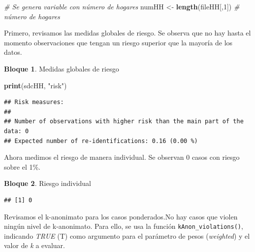 \documentclass[]{book}
\newenvironment{Shaded}{\begin{snugshade}}{\end{snugshade}}
\newcommand{\CommentTok}[1]{\textcolor[rgb]{0.56,0.35,0.01}{\textit{#1}}}
\newcommand{\DecValTok}[1]{\textcolor[rgb]{0.00,0.00,0.81}{#1}}
\newcommand{\FloatTok}[1]{\textcolor[rgb]{0.00,0.00,0.81}{#1}}
\newcommand{\KeywordTok}[1]{\textcolor[rgb]{0.13,0.29,0.53}{\textbf{#1}}}
\newcommand{\NormalTok}[1]{#1}
\newcommand{\OperatorTok}[1]{\textcolor[rgb]{0.81,0.36,0.00}{\textbf{#1}}}
\newcommand{\StringTok}[1]{\textcolor[rgb]{0.31,0.60,0.02}{#1}}
\theoremstyle{definition}
\theoremstyle{definition}
\newtheorem{example}{Bloque}[chapter]
\theoremstyle{definition}
\theoremstyle{definition}
\theoremstyle{remark}
\begin{document}
\begin{Shaded}
\begin{Highlighting}[]
\CommentTok{# Se genera variable con número de hogares}
\NormalTok{numHH <-}\StringTok{ }\KeywordTok{length}\NormalTok{(fileHH[,}\DecValTok{1}\NormalTok{]) }\CommentTok{# número de hogares }
\end{Highlighting}
\end{Shaded}

Primero, revisamos las medidas globales de riesgo. Se observa que no hay hasta el momento observaciones que tengan un riesgo superior que la mayoría de los datos.

\begin{example}
\protect\hypertarget{exm:bloque45nbm}{}{\label{exm:bloque45nbm} }Medidas globales de riesgo
\end{example}

\begin{Shaded}
\begin{Highlighting}[]
\KeywordTok{print}\NormalTok{(sdcHH, }\StringTok{"risk"}\NormalTok{)}
\end{Highlighting}
\end{Shaded}

\begin{verbatim}
## Risk measures:
## 
## Number of observations with higher risk than the main part of the data: 0
## Expected number of re-identifications: 0.16 (0.00 %)
\end{verbatim}

Ahora medimos el riesgo de manera individual. Se observan 0 casos con riesgo sobre el 1\%.
\begin{example}
\protect\hypertarget{exm:bloque46nbm}{}{\label{exm:bloque46nbm} }Riesgo individual
\end{example}

\begin{Shaded}
\end{Shaded}

\begin{verbatim}
## [1] 0
\end{verbatim}

Revisamos el k-anonimato para los casos ponderados.No hay casos que violen ningún nivel de k-anonimato. Para ello, se usa la función \texttt{kAnon\_violations()}, indicando \emph{TRUE} (T) como argumento para el parámetro de pesos (\emph{weighted}) y el valor de \emph{k} a evaluar.
\end{document}
